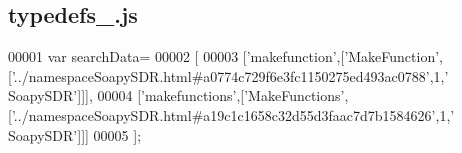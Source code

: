 \subsection{typedefs\+\_.\+js}
\label{typedefs__5_8js_source}

\begin{DoxyCode}
00001 var searchData=
00002 [
00003   [\textcolor{stringliteral}{'makefunction'},[\textcolor{stringliteral}{'MakeFunction'},[\textcolor{stringliteral}{'../namespaceSoapySDR.html#a0774c729f6e3fc1150275ed493ac0788'},1,\textcolor{stringliteral}{'
      SoapySDR'}]]],
00004   [\textcolor{stringliteral}{'makefunctions'},[\textcolor{stringliteral}{'MakeFunctions'},[\textcolor{stringliteral}{'../namespaceSoapySDR.html#a19c1c1658c32d55d3faac7d7b1584626'},1,\textcolor{stringliteral}{'
      SoapySDR'}]]]
00005 ];
\end{DoxyCode}
